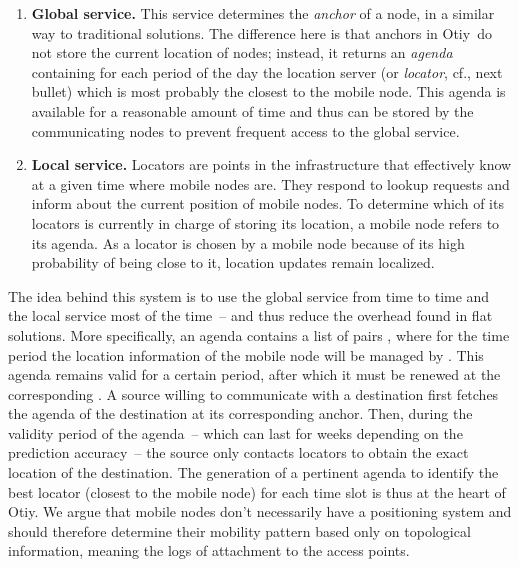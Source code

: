 \documentclass[a4paper]{sig-alternate-10pt}
\newcommand{\otiy}{{\sffamily Otiy}}
\begin{document}
\begin{enumerate}

\item {\bf Global service.} This service determines the {\it anchor}
of a node, in a similar way to traditional solutions. The difference
here is that anchors in \otiy\ do not store the current location of
nodes; instead, it returns an {\it agenda} containing for each
period of the day the location server (or {\it locator}, cf., next
bullet) which is most probably the closest to the mobile node. This
agenda is available for a reasonable amount of time and thus can be
stored by the communicating nodes to prevent frequent access to the
global service.

\item {\bf Local service.} Locators are points in the infrastructure
that effectively know at a given time where mobile nodes are. They respond to lookup
requests and inform about the current position of mobile nodes. To
determine which of its locators is currently in charge of storing
its location, a mobile node refers to its agenda. As a locator is
chosen by a  mobile node because of its high probability of being
close to it, location  updates remain localized.

\end{enumerate}

The idea behind this system is to use the global service from time
to time and the local service most of the time~-- and thus reduce
the overhead found in flat solutions. More specifically, an agenda
contains a list of  pairs , where for
the time period  the location information of the
mobile node will be managed by . This agenda remains
valid for a certain period, after which it must be renewed at the
corresponding . A source willing to communicate with a
destination first fetches the agenda of the destination at its
corresponding anchor. Then, during the validity period of the
agenda~-- which can last for weeks depending on the prediction
accuracy~-- the source only contacts locators to obtain the exact
location of the destination. The generation of a pertinent agenda to
identify the best locator (closest to the mobile node) for each time
slot is thus at the heart of \otiy. We argue that mobile nodes don't
necessarily have a positioning system and should therefore determine
their mobility pattern based only on topological information,
meaning the logs of attachment to the access points.
\end{document}
